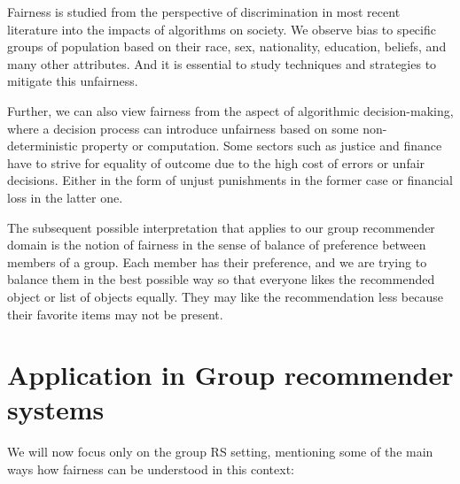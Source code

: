 Fairness is studied from the perspective of discrimination in most recent literature into the impacts of algorithms on society. We observe bias to specific groups of population based on their race, sex, nationality, education, beliefs, and many other attributes. And it is essential to study techniques and strategies to mitigate this unfairness.

Further, we can also view fairness from the aspect of algorithmic decision-making, where a decision process can introduce unfairness based on some non-deterministic property or computation. Some sectors such as justice and finance have to strive for equality of outcome due to the high cost of errors or unfair decisions. Either in the form of unjust punishments in the former case or financial loss in the latter one.

The subsequent possible interpretation that applies to our group recommender domain is the notion of fairness in the sense of balance of preference between members of a group. Each member has their preference, and we are trying to balance them in the best possible way so that everyone likes the recommended object or list of objects equally. They may like the recommendation less because their favorite items may not be present.






\section{Application in Group recommender systems} \label{sec:02_application_in_grs}


We will now focus only on the group RS setting, mentioning some of the main ways how fairness can be understood in this context:

